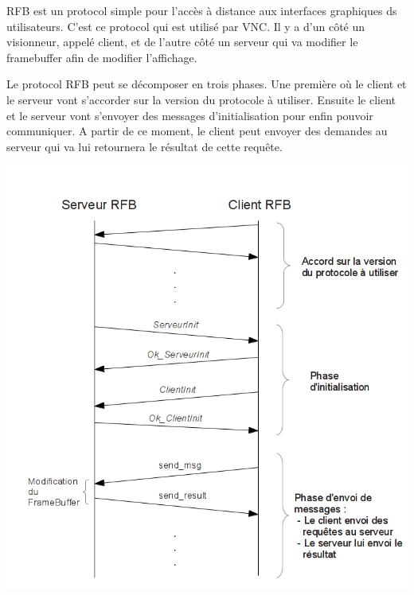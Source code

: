 RFB est un protocol simple pour l'accès à distance aux interfaces graphiques ds utilisateurs. C'est ce protocol qui est utilisé par VNC. Il y a d'un côté un visionneur, appelé client, et de l'autre côté un serveur qui va modifier le framebuffer afin de modifier l'affichage.

Le protocol RFB peut se décomposer en trois phases. Une première où le client et le serveur vont s'accorder sur la version du protocole à utiliser. Ensuite le client et le serveur vont s'envoyer des messages d'initialisation pour enfin pouvoir communiquer. A partir de ce moment, le client peut envoyer des demandes au serveur qui va lui retournera le résultat de cette requête.

\begin{center}
	\includegraphics[scale=0.6]{RFBProtocol.png}
\end{center}